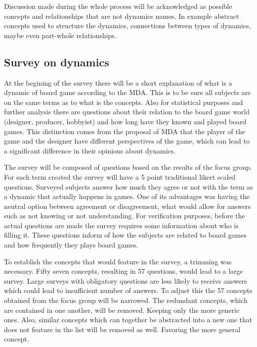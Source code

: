 Discussion made during the whole process will be acknowledged as possible concepts and relationships that are not dynamics names. In example abstract concepts used to structure the dynamics, connections between types of dynamics, maybe even part-whole relationships.



\subsection{Survey on dynamics}

At the begining of the survey there will be a short explanation of what is a dynamic of board game according to the MDA. This is to be sure all subjects are on the same terms as to what is the concepts. Also for statistical purposes and further analysis there are questions about their relation to the board game world (designer, producer, hobbyist) and how long have they known and played board games. This distinction comes from the proposal of MDA that the player of the game and the designer have different perspectives of the game, which can lead to a significant difference in their opinions about dynamics.

The survey will be composed of questions based on the results of the focus group. For each term created the survey will have a 5 point traditional likert scaled questions. Surveyed subjects answer how much they agree or not with the term as a dynamic that actually happens in games. One of its advantages was having the neutral option between agreement or disagreement, what would allow for answers such as not knowing or not understanding. For verification purposes, before the actual questions are made the survey requires some information about who is filling it. These questions inform of how the subjects are related to board games and how frequently they plays board games. \citep{devellis2016scale}

To establish the concepts that would feature in the survey, a trimming was necessary. Fifty seven concepts, resulting in 57 questions, would lead to a large survey. Large surveys with obligatory questions are less likely to receive answers which could lead to insufficient number of answers. To adjust this the 57 concepts obtained from the focus group will be narrowed. The redundant concepts, which are contained in one another, will be removed. Keeping only the more generic ones. Also, similar concepts which can together be abstracted into a new one that does not feature in the list will be removed as well. Favoring the more general concept. \citep{malhotra2012pesquisaMarketing}

